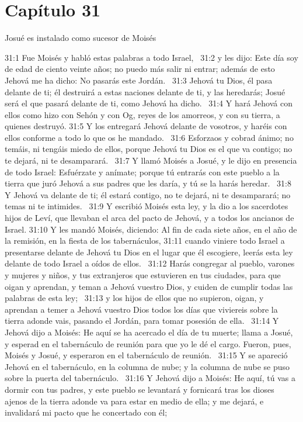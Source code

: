 \section*{Capítulo 31}
Josué es instalado como sucesor de Moisés  

31:1 Fue Moisés y habló estas palabras a todo Israel,  
31:2 y les dijo: Este día soy de edad de ciento veinte años; no puedo más salir ni entrar; además de esto Jehová me ha dicho: No pasarás este Jordán.  
31:3 Jehová tu Dios, él pasa delante de ti; él destruirá a estas naciones delante de ti, y las heredarás; Josué será el que pasará delante de ti, como Jehová ha dicho.  
31:4 Y hará Jehová con ellos como hizo con Sehón y con Og, reyes de los amorreos, y con su tierra, a quienes destruyó. 
31:5 Y los entregará Jehová delante de vosotros, y haréis con ellos conforme a todo lo que os he mandado.  
31:6 Esforzaos y cobrad ánimo; no temáis, ni tengáis miedo de ellos, porque Jehová tu Dios es el que va contigo; no te dejará, ni te desamparará.  
31:7 Y llamó Moisés a Josué, y le dijo en presencia de todo Israel: Esfuérzate y anímate; porque tú entrarás con este pueblo a la tierra que juró Jehová a sus padres que les daría, y tú se la harás heredar.  
31:8 Y Jehová va delante de ti; él estará contigo, no te dejará, ni te desamparará; no temas ni te intimides.  
31:9 Y escribió Moisés esta ley, y la dio a los sacerdotes hijos de Leví, que llevaban el arca del pacto de Jehová, y a todos los ancianos de Israel. 
31:10 Y les mandó Moisés, diciendo: Al fin de cada siete años, en el año de la remisión, en la fiesta de los tabernáculos, 
31:11 cuando viniere todo Israel a presentarse delante de Jehová tu Dios en el lugar que él escogiere, leerás esta ley delante de todo Israel a oídos de ellos.  
31:12 Harás congregar al pueblo, varones y mujeres y niños, y tus extranjeros que estuvieren en tus ciudades, para que oigan y aprendan, y teman a Jehová vuestro Dios, y cuiden de cumplir todas las palabras de esta ley;  
31:13 y los hijos de ellos que no supieron, oigan, y aprendan a temer a Jehová vuestro Dios todos los días que viviereis sobre la tierra adonde vais, pasando el Jordán, para tomar posesión de ella.  
31:14 Y Jehová dijo a Moisés: He aquí se ha acercado el día de tu muerte; llama a Josué, y esperad en el tabernáculo de reunión para que yo le dé el cargo. Fueron, pues, Moisés y Josué, y esperaron en el tabernáculo de reunión.  
31:15 Y se apareció Jehová en el tabernáculo, en la columna de nube; y la columna de nube se puso sobre la puerta del tabernáculo.  
31:16 Y Jehová dijo a Moisés: He aquí, tú vas a dormir con tus padres, y este pueblo se levantará y fornicará tras los dioses ajenos de la tierra adonde va para estar en medio de ella; y me dejará, e invalidará mi pacto que he concertado con él;  
